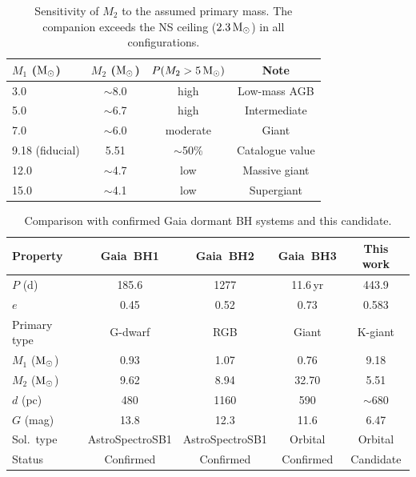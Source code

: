 \documentclass[usenatbib,fleqn]{mnras}
\newcommand{\Msun}{{\rm M}_\odot}
\begin{document}
\begin{table}
\centering
\caption{Sensitivity of $M_2$ to the assumed primary mass.  The
companion exceeds the NS ceiling ($2.3\,\Msun$) in all
configurations.}
\label{tab:sensitivity}
\begin{tabular}{lccc}
\toprule
$M_1$ ($\Msun$) & $M_2$ ($\Msun$) & $P(M_2 > 5\,\Msun)$ & Note \\
\midrule
3.0              & $\sim$8.0  & high     & Low-mass AGB \\
5.0              & $\sim$6.7  & high     & Intermediate \\
7.0              & $\sim$6.0  & moderate & Giant \\
9.18 (fiducial)  & 5.51       & $\sim$50\% & Catalogue value \\
12.0             & $\sim$4.7  & low      & Massive giant \\
15.0             & $\sim$4.1  & low      & Supergiant \\
\bottomrule
\end{tabular}
\end{table}

\begin{table}
\centering
\caption{Comparison with confirmed Gaia dormant BH systems and this
candidate.}
\label{tab:comparison}
\begin{tabular}{lcccc}
\toprule
Property & Gaia~BH1 & Gaia~BH2 & Gaia~BH3 & This work \\
\midrule
$P$ (d)             & 185.6   & 1277    & 11.6\,yr & 443.9   \\
$e$                 & 0.45    & 0.52    & 0.73     & 0.583   \\
Primary type        & G-dwarf & RGB     & Giant    & K-giant \\
$M_1$ ($\Msun$)     & 0.93    & 1.07    & 0.76     & 9.18    \\
$M_2$ ($\Msun$)     & 9.62    & 8.94    & 32.70    & 5.51    \\
$d$ (pc)            & 480     & 1160    & 590      & $\sim$680 \\
$G$ (mag)           & 13.8    & 12.3    & 11.6     & 6.47    \\
Sol.\ type          & AstroSpectroSB1 & AstroSpectroSB1 & Orbital & Orbital \\
Status              & Confirmed & Confirmed & Confirmed & Candidate \\
\bottomrule
\end{tabular}
\end{table}
\end{document}
